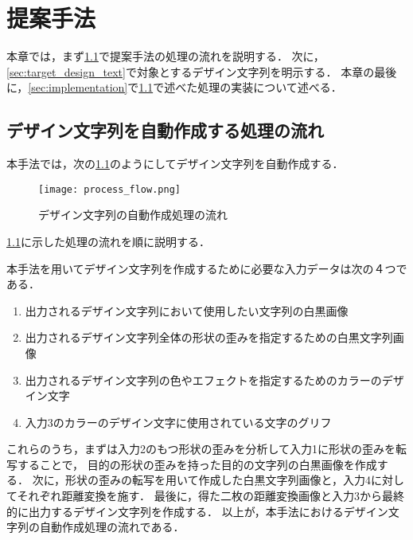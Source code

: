 \documentclass[\homedir/main.tex]{subfiles}
\begin{document}
\setcounter{chapter}{3}
\chapter{提案手法}\label{chap:methods}
本章では，まず\cref{sec:process_flow}で提案手法の処理の流れを説明する．
次に，\cref{sec:target_design_text}で対象とするデザイン文字列を明示する．
本章の最後に，\cref{sec:implementation}で\cref{sec:process_flow}で述べた処理の実装について述べる．

\section{デザイン文字列を自動作成する処理の流れ}\label{sec:process_flow}
本手法では，次の\cref{fig:process_flow}のようにしてデザイン文字列を自動作成する．

\begin{figure}[h]
    \centering
    \texttt{[image: process\_flow.png]}
    \caption{デザイン文字列の自動作成処理の流れ}
    \label{fig:process_flow}
\end{figure}

\cref{fig:process_flow}に示した処理の流れを順に説明する．

本手法を用いてデザイン文字列を作成するために必要な入力データは次の４つである．

\begin{enumerate}[label=\textbf{入力\arabic*:}]
    \item 出力されるデザイン文字列において使用したい文字列の白黒画像
    \item 出力されるデザイン文字列全体の形状の歪みを指定するための白黒文字列画像
    \item 出力されるデザイン文字列の色やエフェクトを指定するためのカラーのデザイン文字
    \item 入力3のカラーのデザイン文字に使用されている文字のグリフ
\end{enumerate}

これらのうち，まずは入力2のもつ形状の歪みを分析して入力1に形状の歪みを転写することで，
目的の形状の歪みを持った目的の文字列の白黒画像を作成する．
次に，形状の歪みの転写を用いて作成した白黒文字列画像と，入力4に対してそれぞれ距離変換を施す．
最後に，得た二枚の距離変換画像と入力3から最終的に出力するデザイン文字列を作成する．
以上が，本手法におけるデザイン文字列の自動作成処理の流れである．
\end{document}
